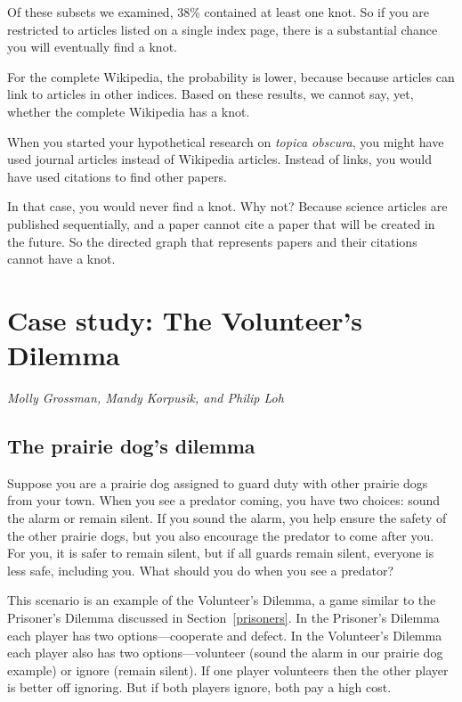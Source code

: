 \documentclass[10pt]{book}
\begin{document}
Of these subsets we examined, 38\% contained at least one knot. So if
you are restricted to articles listed on a single index page, there is
a substantial chance you will eventually find a knot.

For the complete Wikipedia, the probability is lower, because
because articles can link to articles in other indices.  Based on
these results, we cannot say, yet, whether the complete Wikipedia
has a knot.


When you started your hypothetical research on \emph{topica obscura},
you might have used journal articles instead of Wikipedia articles.
Instead of links, you would have used citations to find other papers.

In that case, you would never find a knot.  Why not? 
Because science articles are
published sequentially, and a paper cannot cite a paper that will be
created in the future.  So the directed graph that represents papers
and their citations cannot have a knot.



\chapter{Case study: The Volunteer's Dilemma}

{\em Molly Grossman, Mandy Korpusik, and Philip Loh}


\section{The prairie dog's dilemma}

Suppose you are a prairie dog assigned to guard duty with other
prairie dogs from your town.  When you see a predator coming, you have
two choices: sound the alarm or remain silent.  If you sound the
alarm, you help ensure the safety of the other prairie dogs, but you
also encourage the predator to come after you.  For you, it is safer
to remain silent, but if all guards remain silent, everyone is less
safe, including you.  What should you do when you see a predator?

This scenario is an example of the Volunteer's Dilemma, a game similar
to the Prisoner's Dilemma discussed in Section~\ref{prisoners}.  In
the Prisoner's Dilemma each player has two options---cooperate and
defect.  In the Volunteer's Dilemma each player also has two
options---volunteer (sound the alarm in our prairie dog example) or
ignore (remain silent).  If one player volunteers then the other
player is better off ignoring.  But if both players ignore, both pay a
high cost.
\end{document}
